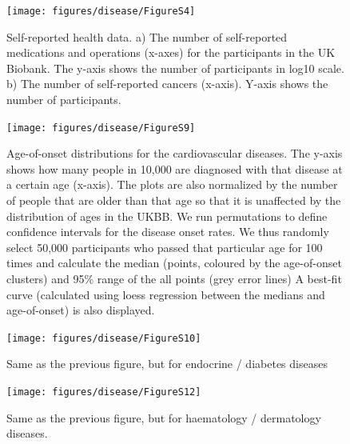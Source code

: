 \documentclass[12pt,twoside]{unicam}
\begin{document}
\begin{figure}

{\centering \texttt{[image: figures/disease/FigureS4]} 

}

\caption[Self-reported medications, operations, and cancers.]{Self-reported health data. a) The number of self-reported medications and operations (x-axes) for the participants in the UK Biobank. The y-axis shows the number of participants in log10 scale. b) The number of self-reported cancers (x-axis). Y-axis shows the number of participants.}\label{fig:disFigS4}
\end{figure}

\begin{figure}

{\centering \texttt{[image: figures/disease/FigureS9]} 

}

\caption[Age-of-onset distributions for the cardiovascular diseases.]{Age-of-onset distributions for the cardiovascular diseases. The y-axis shows how many people in 10,000 are diagnosed with that disease at a certain age (x-axis). The plots are also normalized by the number of people that are older than that age so that it is unaffected by the distribution of ages in the UKBB. We run permutations to define confidence intervals for the disease onset rates. We thus randomly select 50,000 participants who passed that particular age for 100 times and calculate the median (points, coloured by the age-of-onset clusters) and 95\% range of the all points (grey error lines) A best-fit curve (calculated using loess regression between the medians and age-of-onset) is also displayed.}\label{fig:disFigS9}
\end{figure}

\begin{figure}

{\centering \texttt{[image: figures/disease/FigureS10]} 

}

\caption[Age-of-onset distributions for the endocrine / diabetes diseases.]{Same as the previous figure, but for endocrine / diabetes diseases}\label{fig:disFigS10}
\end{figure}

\begin{figure}

{\centering \texttt{[image: figures/disease/FigureS12]} 

}

\caption[Age-of-onset distributions for the haematology / dermatology diseases.]{Same as the previous figure, but for haematology / dermatology diseases.}\label{fig:disFigS12}
\end{figure}
\end{document}

